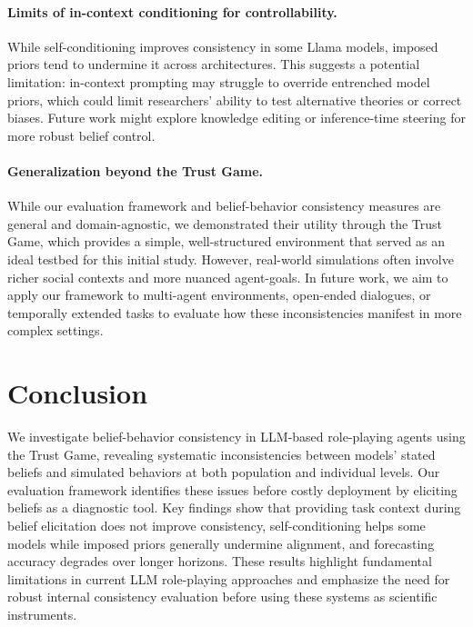\documentclass{article} %
\begin{document}

\paragraph{Limits of in-context conditioning for controllability.} While self-conditioning improves consistency in some Llama models, imposed priors tend to undermine it across architectures. This suggests a potential limitation: in-context prompting may struggle to override entrenched model priors, which could limit researchers' ability to test alternative theories or correct biases. Future work might explore knowledge editing \citep{wang2023easyedit, orgad2024llms} or inference-time steering \citep{li2023inference,lamb2024focus,minder2025controllable} for more robust belief control.

\paragraph{Generalization beyond the Trust Game.} While our evaluation framework and belief-behavior consistency measures are general and domain-agnostic, we demonstrated their utility through the Trust Game, which provides a simple, well-structured environment that served as an ideal testbed for this initial study. However, real-world simulations often involve richer social contexts and more nuanced agent-goals. In future work, we aim to apply our framework to multi-agent environments, open-ended dialogues, or temporally extended tasks to evaluate how these inconsistencies manifest in more complex settings.



\section{Conclusion}
\label{sec:conclusion}

We investigate belief-behavior consistency in LLM-based role-playing agents using the Trust Game, revealing systematic inconsistencies between models' stated beliefs and simulated behaviors at both population and individual levels. Our evaluation framework identifies these issues before costly deployment by eliciting beliefs as a diagnostic tool. Key findings show that providing task context during belief elicitation does not improve consistency, self-conditioning helps some models while imposed priors generally undermine alignment, and forecasting accuracy degrades over longer horizons. These results highlight fundamental limitations in current LLM role-playing approaches and emphasize the need for robust internal consistency evaluation before using these systems as scientific instruments.
\end{document}
